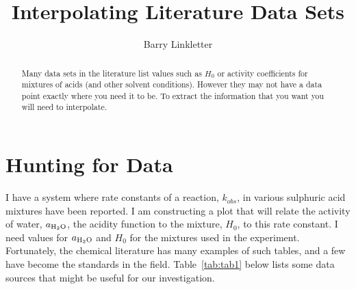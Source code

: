 \documentclass[]{tufte-handout}
\title{Interpolating Literature Data Sets}
\author[Barry Linkletter]{Barry Linkletter}
\date{} %
\begin{document}
\justifying

\maketitle
{}
\begin{abstract}

\noindent Many data sets in the literature list values such as $H_0$ or activity coefficients for mixtures of acids (and other solvent conditions). However they may not have a data point exactly where you need it to be. To extract the information that you want you will need to interpolate.

\end{abstract}




\section{Hunting for Data}


I have a system where rate constants of a reaction, $k_{obs}$, in various sulphuric acid mixtures have been reported. I am constructing a plot that will relate the activity of water, $a_{\ce{H2O}}$, the acidity function to the mixture, $H_0$, to this rate constant. I need values for $a_{\ce{H2O}}$ and $H_0$ for the mixtures used in the experiment. Fortunately, the chemical literature has many examples of such tables, and a few have become the standards in the field. Table~\ref{tab:tab1} below lists some data sources that might be useful for our investigation.
\end{document}
